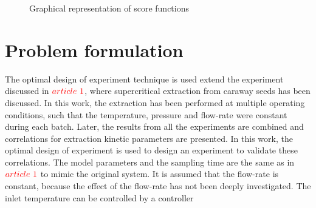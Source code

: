 \documentclass[]{scrartcl}
\begin{document}
\begin{figure}[!h]
	\centering
	\caption{Graphical representation of score functions}
	\label{fig:score_fun}
\end{figure}

\section{Problem formulation}

The optimal design of experiment technique is used extend the experiment discussed in ${\color{red}article~1}$, where supercritical extraction from caraway seeds has been discussed. In this work, the extraction has been performed at multiple operating conditions, such that the temperature, pressure and flow-rate were constant during each batch. Later, the results from all the experiments are combined and correlations for extraction kinetic parameters are presented. In this work, the optimal design of experiment is used to design an experiment to validate these correlations. The model parameters and the sampling time are the same as in ${\color{red}article~1}$ to mimic the original system. It is assumed that the flow-rate is constant, because the effect of the flow-rate has not been deeply investigated. The inlet temperature can be controlled by a controller 
\end{document}

